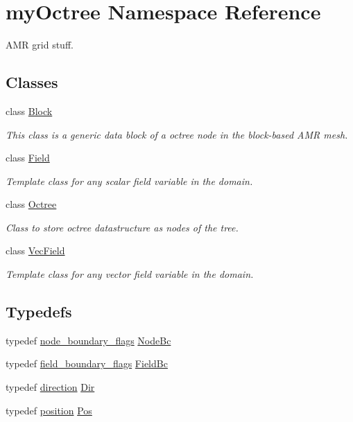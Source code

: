 \hypertarget{namespacemy_octree}{}\section{my\+Octree Namespace Reference}
\label{namespacemy_octree}


A\+M\+R grid stuff.  


\subsection*{Classes}
\begin{DoxyCompactItemize}
\item 
class \hyperlink{classmy_octree_1_1_block}{Block}
\begin{DoxyCompactList}\small\item\em This class is a generic data block of a octree node in the block-\/based A\+M\+R mesh. \end{DoxyCompactList}\item 
class \hyperlink{classmy_octree_1_1_field}{Field}
\begin{DoxyCompactList}\small\item\em Template class for any scalar field variable in the domain. \end{DoxyCompactList}\item 
class \hyperlink{classmy_octree_1_1_octree}{Octree}
\begin{DoxyCompactList}\small\item\em Class to store octree datastructure as nodes of the tree. \end{DoxyCompactList}\item 
class \hyperlink{classmy_octree_1_1_vec_field}{Vec\+Field}
\begin{DoxyCompactList}\small\item\em Template class for any vector field variable in the domain. \end{DoxyCompactList}\end{DoxyCompactItemize}
\subsection*{Typedefs}
\begin{DoxyCompactItemize}
\item 
typedef \hyperlink{namespacemy_octree_adc4c8dcd84e804f57592145c650dd017}{node\+\_\+boundary\+\_\+flags} \hyperlink{namespacemy_octree_aa311ec15135ad37690de8c062cfd8124}{Node\+Bc}
\item 
typedef \hyperlink{namespacemy_octree_a1b5634e126358fc57232cfc9e6d96ad9}{field\+\_\+boundary\+\_\+flags} \hyperlink{namespacemy_octree_a7fe9f44df74345b4ab428b88ed3bba4e}{Field\+Bc}
\item 
typedef \hyperlink{namespacemy_octree_a37e50dbbdf1f0cfd834254378771ade8}{direction} \hyperlink{namespacemy_octree_a4895f593ecb4b9b86353c728c62fff97}{Dir}
\item 
typedef \hyperlink{namespacemy_octree_a02785beaf89d85f4ee008fb0e503b8db}{position} \hyperlink{namespacemy_octree_a959e38545673b2266bead87ede9c2e9b}{Pos}
\end{DoxyCompactItemize}

